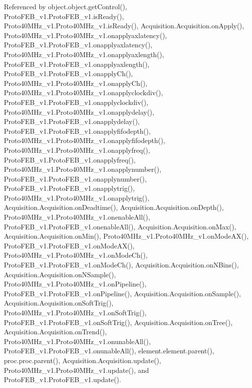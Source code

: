 Referenced by object.\+object.\+get\+Control(), Proto\+F\+E\+B\+\_\+v1.\+Proto\+F\+E\+B\+\_\+v1.\+is\+Ready(), Proto40\+M\+Hz\+\_\+v1.\+Proto40\+M\+Hz\+\_\+v1.\+is\+Ready(), Acquisition.\+Acquisition.\+on\+Apply(), Proto40\+M\+Hz\+\_\+v1.\+Proto40\+M\+Hz\+\_\+v1.\+onapplyaxlatency(), Proto\+F\+E\+B\+\_\+v1.\+Proto\+F\+E\+B\+\_\+v1.\+onapplyaxlatency(), Proto40\+M\+Hz\+\_\+v1.\+Proto40\+M\+Hz\+\_\+v1.\+onapplyaxlength(), Proto\+F\+E\+B\+\_\+v1.\+Proto\+F\+E\+B\+\_\+v1.\+onapplyaxlength(), Proto\+F\+E\+B\+\_\+v1.\+Proto\+F\+E\+B\+\_\+v1.\+onapply\+Ch(), Proto40\+M\+Hz\+\_\+v1.\+Proto40\+M\+Hz\+\_\+v1.\+onapply\+Ch(), Proto40\+M\+Hz\+\_\+v1.\+Proto40\+M\+Hz\+\_\+v1.\+onapplyclockdiv(), Proto\+F\+E\+B\+\_\+v1.\+Proto\+F\+E\+B\+\_\+v1.\+onapplyclockdiv(), Proto40\+M\+Hz\+\_\+v1.\+Proto40\+M\+Hz\+\_\+v1.\+onapplydelay(), Proto\+F\+E\+B\+\_\+v1.\+Proto\+F\+E\+B\+\_\+v1.\+onapplydelay(), Proto\+F\+E\+B\+\_\+v1.\+Proto\+F\+E\+B\+\_\+v1.\+onapplyfifodepth(), Proto40\+M\+Hz\+\_\+v1.\+Proto40\+M\+Hz\+\_\+v1.\+onapplyfifodepth(), Proto40\+M\+Hz\+\_\+v1.\+Proto40\+M\+Hz\+\_\+v1.\+onapplyfreq(), Proto\+F\+E\+B\+\_\+v1.\+Proto\+F\+E\+B\+\_\+v1.\+onapplyfreq(), Proto40\+M\+Hz\+\_\+v1.\+Proto40\+M\+Hz\+\_\+v1.\+onapplynumber(), Proto\+F\+E\+B\+\_\+v1.\+Proto\+F\+E\+B\+\_\+v1.\+onapplynumber(), Proto\+F\+E\+B\+\_\+v1.\+Proto\+F\+E\+B\+\_\+v1.\+onapplytrig(), Proto40\+M\+Hz\+\_\+v1.\+Proto40\+M\+Hz\+\_\+v1.\+onapplytrig(), Acquisition.\+Acquisition.\+on\+Deadtime(), Acquisition.\+Acquisition.\+on\+Depth(), Proto40\+M\+Hz\+\_\+v1.\+Proto40\+M\+Hz\+\_\+v1.\+onenable\+All(), Proto\+F\+E\+B\+\_\+v1.\+Proto\+F\+E\+B\+\_\+v1.\+onenable\+All(), Acquisition.\+Acquisition.\+on\+Max(), Acquisition.\+Acquisition.\+on\+Min(), Proto40\+M\+Hz\+\_\+v1.\+Proto40\+M\+Hz\+\_\+v1.\+on\+Mode\+A\+X(), Proto\+F\+E\+B\+\_\+v1.\+Proto\+F\+E\+B\+\_\+v1.\+on\+Mode\+A\+X(), Proto40\+M\+Hz\+\_\+v1.\+Proto40\+M\+Hz\+\_\+v1.\+on\+Mode\+Ch(), Proto\+F\+E\+B\+\_\+v1.\+Proto\+F\+E\+B\+\_\+v1.\+on\+Mode\+Ch(), Acquisition.\+Acquisition.\+on\+N\+Bins(), Acquisition.\+Acquisition.\+on\+N\+Sample(), Proto40\+M\+Hz\+\_\+v1.\+Proto40\+M\+Hz\+\_\+v1.\+on\+Pipeline(), Proto\+F\+E\+B\+\_\+v1.\+Proto\+F\+E\+B\+\_\+v1.\+on\+Pipeline(), Acquisition.\+Acquisition.\+on\+Sample(), Acquisition.\+Acquisition.\+on\+Soft\+Trig(), Proto40\+M\+Hz\+\_\+v1.\+Proto40\+M\+Hz\+\_\+v1.\+on\+Soft\+Trig(), Proto\+F\+E\+B\+\_\+v1.\+Proto\+F\+E\+B\+\_\+v1.\+on\+Soft\+Trig(), Acquisition.\+Acquisition.\+on\+Tree(), Acquisition.\+Acquisition.\+on\+Trend(), Proto40\+M\+Hz\+\_\+v1.\+Proto40\+M\+Hz\+\_\+v1.\+onunable\+All(), Proto\+F\+E\+B\+\_\+v1.\+Proto\+F\+E\+B\+\_\+v1.\+onunable\+All(), element.\+element.\+parent(), proc.\+proc.\+parent(), Acquisition.\+Acquisition.\+update(), Proto40\+M\+Hz\+\_\+v1.\+Proto40\+M\+Hz\+\_\+v1.\+update(), and Proto\+F\+E\+B\+\_\+v1.\+Proto\+F\+E\+B\+\_\+v1.\+update().


